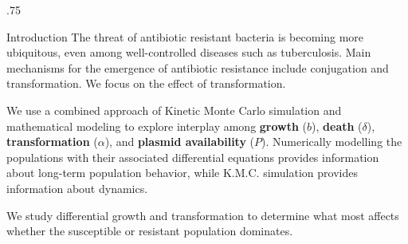 \documentclass[final]{beamer}
\newlength{\sepwid}
\newlength{\onecolwid}
\begin{document}
\begin{frame}[t] %

\begin{block}

\begin{columns}[t] %

\begin{column}{.75\onecolwid}

  \begin{alertblock}{Introduction}
  The threat of antibiotic resistant bacteria is becoming more ubiquitous, even
  among well-controlled diseases such as tuberculosis. Main mechanisms
  for the emergence of antibiotic resistance include conjugation and transformation.
  We focus on the effect of transformation.

  \quad\quad We use a combined approach of Kinetic Monte Carlo simulation and
  mathematical
  modeling to explore interplay among \textbf{growth} ($b$), \textbf{death} ($\delta$), \textbf{transformation} ($\alpha$), and \textbf{plasmid availability} ($P$).
  Numerically modelling the populations with their
  associated differential equations provides information about long-term
  population behavior, while K.M.C. simulation provides information about dynamics.

  \quad\quad We study differential growth and transformation to
  determine what most affects whether the susceptible or resistant population
  dominates.

  \vspace{11ex}
  \end{alertblock}
\end{column}



\end{columns}
\end{block}
\end{frame}
\end{document}
